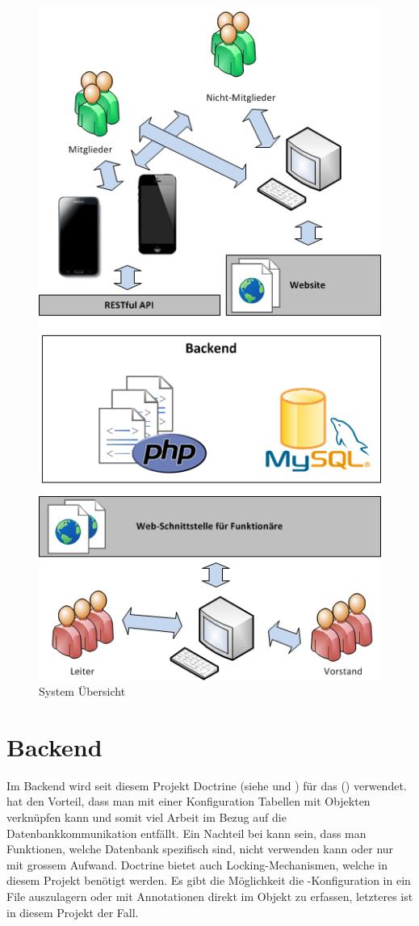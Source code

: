 \begin{figure}[h]
\centering
\includegraphics[scale=0.5]{images/visio/SystemScope.png}
\caption{System Übersicht}
\label{fig:system_scope}
\end{figure}

\section{Backend}\label{arch_backend}
Im  Backend wird seit diesem Projekt Doctrine (siehe \cite{doctrine} und \cite{dunglas2013persistence}) für das  () verwendet.  hat den Vorteil, dass man mit einer Konfiguration Tabellen mit Objekten verknüpfen kann und somit viel Arbeit im Bezug auf die Datenbankkommunikation entfällt. Ein Nachteil bei  kann sein, dass man Funktionen, welche Datenbank spezifisch sind, nicht verwenden kann oder nur mit grossem Aufwand. Doctrine bietet auch Locking-Mechanismen, welche in diesem Projekt benötigt werden. Es gibt die Möglichkeit die -Konfiguration in ein File auszulagern oder mit Annotationen direkt im Objekt zu erfassen, letzteres ist in diesem Projekt der Fall. 

